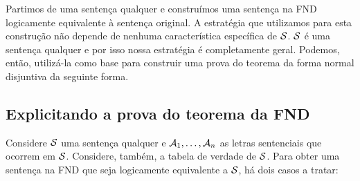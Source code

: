 Partimos de uma sentença qualquer e construímos uma sentença na FND logicamente equivalente à sentença original.
A estratégia que utilizamos para esta construção não depende de nenhuma característica específica de $\mathcal{S}$.
$\mathcal{S}$ é uma sentença qualquer e por isso nossa estratégia é completamente geral.
Podemos, então, utilizá-la como base para construir uma prova do teorema da forma normal disjuntiva da seguinte forma.

\subsection{Explicitando a prova do teorema da FND}
Considere  $\mathcal{S}$ uma sentença qualquer e $\mathcal{A}_1, \ldots, \mathcal{A}_n$ as letras sentenciais que ocorrem em $\mathcal{S}$.
Considere, também, a tabela de verdade de $\mathcal{S}$.
Para obter uma sentença na FND que seja logicamente equivalente a $\mathcal{S}$, há dois casos a tratar:
